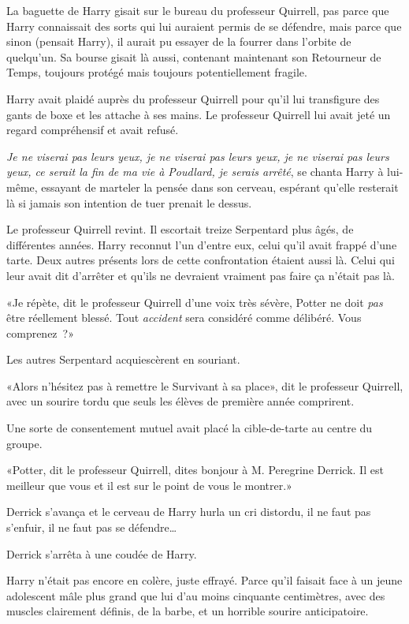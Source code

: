 La baguette de Harry gisait sur le bureau du professeur Quirrell, pas parce que Harry connaissait des sorts qui lui auraient permis de se défendre, mais parce que sinon (pensait Harry), il aurait pu essayer de la fourrer dans l'orbite de quelqu'un. Sa bourse gisait là aussi, contenant maintenant son Retourneur de Temps, toujours protégé mais toujours potentiellement fragile.

Harry avait plaidé auprès du professeur Quirrell pour qu'il lui transfigure des gants de boxe et les attache à ses mains. Le professeur Quirrell lui avait jeté un regard compréhensif et avait refusé.

\emph{Je ne viserai pas leurs yeux, je ne viserai pas leurs yeux, je ne viserai pas leurs yeux, ce serait la fin de ma vie à Poudlard, je serais arrêté}, se chanta Harry à lui-même, essayant de marteler la pensée dans son cerveau, espérant qu'elle resterait là si jamais son intention de tuer prenait le dessus.

Le professeur Quirrell revint. Il escortait treize Serpentard plus âgés, de différentes années. Harry reconnut l'un d'entre eux, celui qu'il avait frappé d'une tarte. Deux autres présents lors de cette confrontation étaient aussi là. Celui qui leur avait dit d'arrêter et qu'ils ne devraient vraiment pas faire ça n'était pas là.

«Je répète, dit le professeur Quirrell d'une voix très sévère, Potter ne doit \emph{pas} être réellement blessé. Tout \emph{accident} sera considéré comme délibéré. Vous comprenez~?»

Les autres Serpentard acquiescèrent en souriant.

«Alors n'hésitez pas à remettre le Survivant à sa place», dit le professeur Quirrell, avec un sourire tordu que seuls les élèves de première année comprirent.

Une sorte de consentement mutuel avait placé la cible-de-tarte au centre du groupe.

«Potter, dit le professeur Quirrell, dites bonjour à M. Peregrine Derrick. Il est meilleur que vous et il est sur le point de vous le montrer.»

Derrick s'avança et le cerveau de Harry hurla un cri distordu, il ne faut pas s'enfuir, il ne faut pas se défendre…

Derrick s'arrêta à une coudée de Harry.

Harry n'était pas encore en colère, juste effrayé. Parce qu'il faisait face à un jeune adolescent mâle plus grand que lui d'au moins cinquante centimètres, avec des muscles clairement définis, de la barbe, et un horrible sourire anticipatoire.

